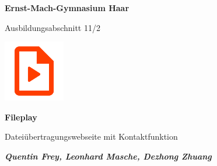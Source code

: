 \begin{titlepage}
  \begin{center}
    \textbf{Ernst-Mach-Gymnasium Haar}

    \vspace{0.5cm}

    Ausbildungsabschnitt 11/2

    \vspace{1cm}

    \includegraphics[width=0.2\textwidth]{fileplay.png}

    \vspace*{1cm}

    \textbf{Fileplay}

    \vspace{0.5cm}

    Dateiübertragungswebseite mit Kontaktfunktion

    \vfill
           
    \textbf{
      \textit{Quentin Frey, Leonhard Masche, Dezhong Zhuang}
    }

  \end{center}
\end{titlepage}
